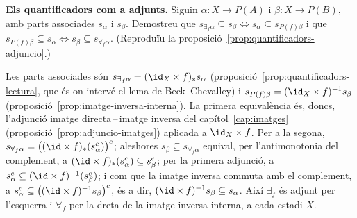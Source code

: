 \begin{exercici}
\textbf{Els quantificadors com a adjunts.} Siguin \(\alpha\colon X\to P(A)\) i \(\beta\colon X\to P(B)\), amb parts associades \(s_\alpha\) i \(s_\beta\). Demostreu que \(s_{\exists_f\alpha}\subseteq s_\beta\iff s_\alpha\subseteq s_{P(f)\beta}\) i que \(s_{P(f)\beta}\subseteq s_\alpha\iff s_\beta\subseteq s_{\forall_f\alpha}\). (Reproduïu la proposició~\ref{prop:quantificadors-adjuncio}.)
\end{exercici}
\begin{solucio}
Les parts associades són \(s_{\exists_f\alpha}=(\id_X\times f)_*s_\alpha\) (proposició~\ref{prop:quantificadors-lectura}, que és on intervé el lema de Beck--Chevalley) i \(s_{P(f)\beta}=(\id_X\times f)^{-1}s_\beta\) (proposició~\ref{prop:imatge-inversa-interna}). La primera equivalència és, doncs, l'adjunció imatge directa\,--\,imatge inversa del capítol~\ref{cap:imatges} (proposició~\ref{prop:adjuncio-imatges}) aplicada a \(\id_X\times f\). Per a la segona, \(s_{\forall_f\alpha}=\bigl((\id\times f)_*(s_\alpha^c)\bigr)^c\); aleshores \(s_\beta\subseteq s_{\forall_f\alpha}\) equival, per l'antimonotonia del complement, a \((\id\times f)_*(s_\alpha^c)\subseteq s_\beta^c\); per la primera adjunció, a \(s_\alpha^c\subseteq(\id\times f)^{-1}(s_\beta^c)\); i com que la imatge inversa commuta amb el complement, a \(s_\alpha^c\subseteq\bigl((\id\times f)^{-1}s_\beta\bigr)^c\), és a dir, \((\id\times f)^{-1}s_\beta\subseteq s_\alpha\). Així \(\exists_f\) és adjunt per l'esquerra i \(\forall_f\) per la dreta de la imatge inversa interna, a cada estadi \(X\).
\end{solucio}
